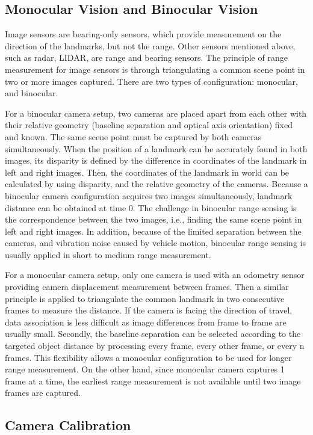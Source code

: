 \subsection{Monocular Vision and Binocular Vision}
Image sensors are bearing-only sensors, which provide measurement on
the direction of the landmarks, but not the range. Other sensors
mentioned above, such as radar, LIDAR, are range and bearing sensors.
The principle of range measurement for image sensors is through
triangulating a common scene point in two or more images captured.
There are two types of configuration: monocular, and binocular.

For a binocular camera setup, two cameras are placed apart from each
other with their relative geometry (baseline separation and optical
axis orientation) fixed and known. The same scene point must be
captured by both cameras simultaneously. When the position of a
landmark can be accurately found in both images, its disparity is
defined by the difference in coordinates of the landmark in left and
right images. Then, the coordinates of the landmark in world can be
calculated by using disparity, and the relative geometry of the
cameras. Because a binocular camera configuration acquires two images
simultaneously, landmark distance can be obtained at time $0$. The
challenge in binocular range sensing is the correspondence between the
two images, i.e., finding the same scene point in left and right
images. In addition, because of the limited separation between the
cameras, and vibration noise caused by vehicle motion, binocular range
sensing is usually applied in short to medium range measurement.

For a monocular camera setup, only one camera is used with an odometry
sensor providing camera displacement measurement between frames. Then
a similar principle is applied to triangulate the common landmark in two
consecutive frames to measure the distance. If the camera is facing the
direction of travel, data association is less difficult as image
differences from frame to frame are usually small. Secondly, the
baseline separation can be selected according to the targeted object
distance by processing every frame, every other frame, or every n
frames. This flexibility allows a monocular configuration to be
used for longer range measurement. On the other hand, since monocular
camera captures 1 frame at a time, the earliest range measurement is
not available until two image frames are captured.

\subsection{Camera Calibration}

